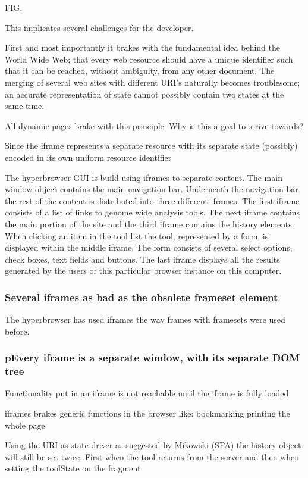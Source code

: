 \documentclass[english]{ifimaster}
\begin{document}
FIG.

This implicates several challenges for the developer. 

First and most importantly it brakes with the fundamental idea behind the World Wide Web; that every web resource should have a unique identifier such that it can be reached, without ambiguity, from any other document. The merging of several web sites with different URI's naturally becomes troublesome; an accurate representation of state cannot possibly contain two states at the same time.

All dynamic pages brake with this principle.
Why is this a goal to strive towards?

Since the iframe represents a separate resource with its separate state (possibly) encoded in its own uniform resource identifier 

The hyperbrowser GUI is build using iframes to separate content. The main window object contains the main navigation bar. Underneath the navigation bar the rest of the content is distributed into three different iframes. The first iframe consists of a list of links to genome wide analysis tools. The next iframe contains the main portion of the site and the third iframe contains the history elements. When clicking an item in the tool list the tool, represented by a form, is displayed within the middle iframe. The form consists of several select options, check boxes, text fields and buttons. The last iframe displays all the results generated by the users of this particular browser instance on this computer.

\subsubsection{Several iframes as bad as the obsolete frameset element}
The hyperbrowser has used iframes the way frames with framesets were used before.
\subsubsection{pEvery iframe is a separate window, with its separate DOM tree}
Functionality put in an iframe is not reachable until the iframe is fully loaded.

iframes brakes generic functions in the browser like:
bookmarking
printing the whole page

Using the URI as state driver as suggested by Mikowski (SPA) the history object will still be set twice. First when the tool returns from the server and then when setting the toolState on the fragment.
\end{document}
